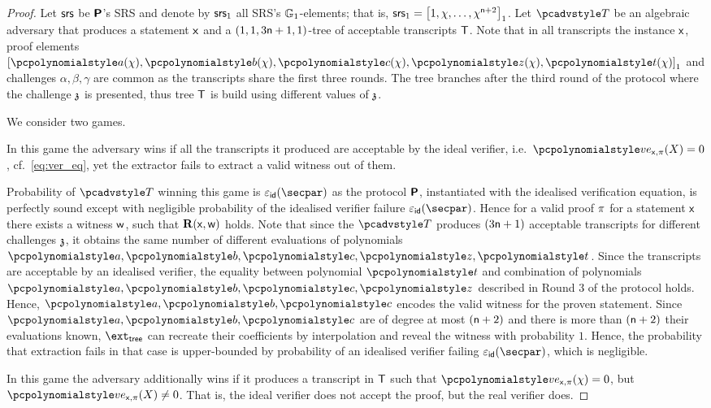 \documentclass[runningheads,11pt]{llncs}
\begin{document}
\iffalse
\begin{proof}
  Let $\mathsf{srs}$ be $\bm{\mathsf{P}}$'s SRS and denote by $\mathsf{srs}_1$ all SRS's
  $\mathbb{G}_1$-elements; that is,
  $\mathsf{srs}_1 = \left[1, \chi, \ldots, \chi^{\mathsf{n} + 2}\right]_{1}$. Let $\tdv$ be an
  algebraic adversary that produces a statement $\mathsf{x}$ and a
  $(1, 1, 3\mathsf{n} + 1, 1)$-tree of acceptable transcripts $\mathsf{T}$.  Note that in
  all transcripts the instance $\mathsf{x}$, proof elements
  $\gone{\p{a}(\chi), \p{b}(\chi), \p{c}(\chi), \p{z}(\chi), \p{t}(\chi)}$ and
  challenges $\alpha, \beta, \gamma$ are common as the transcripts share the
  first three rounds. The tree branches after the third round of the protocol
  where the challenge $\mathfrak{z}$ is presented, thus tree $\mathsf{T}$ is build using
  different values of $\mathfrak{z}$.

  We consider two games.

   In this game the adversary wins if all the transcripts it
  produced are acceptable by the ideal verifier,
  i.e.~$\vereq_{\inp, \zkproof}(X) = 0$, cf.~\cref{eq:ver_eq}, yet the extractor
  fails to extract a valid witness out of them.

  Probability of $\tdv$ winning this game is $\epsid(\secpar)$ as the protocol
  $\bm{\mathsf{P}}$, instantiated with the idealised verification equation, is
  perfectly sound except with negligible probability of the idealised verifier
  failure $\epsid(\secpar)$. Hence for a valid proof $\pi$ for a statement
  $\mathsf{x}$ there exists a witness $\mathsf{w}$, such that $\mathbf{R}(\mathsf{x}, \mathsf{w})$ holds. Note
  that since the $\tdv$ produces $(3 \mathsf{n} + 1)$ acceptable transcripts for
  different challenges $\mathfrak{z}$, it obtains the same number of different
  evaluations of polynomials $\p{a}, \p{b}, \p{c}, \p{z}, \p{t}$. Since the
  transcripts are acceptable by an idealised verifier, the equality between
  polynomial $\p{t}$ and combination of polynomials $\p{a}, \p{b}, \p{c}, \p{z}$
  described in Round 3 of the protocol holds. Hence, $\p{a}, \p{b}, \p{c}$
  encodes the valid witness for the proven statement. Since
  $\p{a}, \p{b}, \p{c}$ are of degree at most $(\mathsf{n} + 2)$ and there is more
  than $(\mathsf{n} + 2)$ their evaluations known, $\extt$ can recreate their
  coefficients by interpolation and reveal the witness with probability
  $1$. Hence, the probability that extraction fails in that case is
  upper-bounded by probability of an idealised verifier failing
  $\epsid(\secpar)$, which is negligible.

   In this game the adversary additionally wins if it produces a
  transcript in $\mathsf{T}$ such that $\vereq_{\inp, \zkproof}(\chi) = 0$, but
  $\vereq_{\inp, \zkproof}(X) \neq 0$. That is, the ideal verifier does not
  accept the proof, but the real verifier does.


\end{proof}
\end{document}
